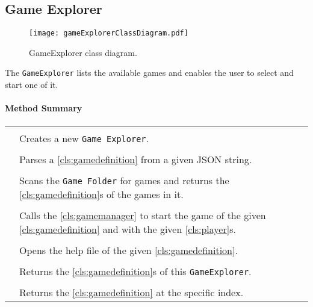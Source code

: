 \subsection{Game Explorer}

\begin{figure}[h]
	\centering
	\texttt{[image: gameExplorerClassDiagram.pdf]}
	\caption{GameExplorer class diagram.}
	\label{img:gameExplorerClassDiagram}
\end{figure}
\pagebreak

The \texttt{GameExplorer} lists the available games and enables the user to select and start one of it.

\centerdash

\paragraph*{Method Summary}
\paragraph*{}
\begin{longtable}{Lp{10cm}}
	\startmethodtable
	 \\
	& Creates a new \texttt{Game Explorer}. \\
	 \\
	& Parses a \ref{cls:gamedefinition} from a given JSON string. \\
	 \\
	& Scans the \texttt{Game Folder} for games and returns the \ref{cls:gamedefinition}s of the games in it. \\
	 \\
	& Calls the \ref{cls:gamemanager} to start the game of the given \ref{cls:gamedefinition} and with the given \ref{cls:player}s. \\
	 \\
	& Opens the help file of the given \ref{cls:gamedefinition}. \\
	 \\
	& Returns the \ref{cls:gamedefinition}s of this \texttt{GameExplorer}. \\
	 \\
	& Returns the \ref{cls:gamedefinition} at the specific index. \\
	\hline
\end{longtable}

